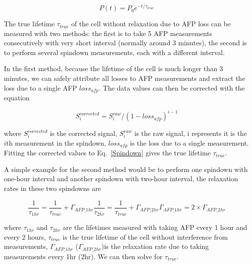 \begin{equation}\label{Spindown}
P(t)=P_{0}e^{-t/\tau_{true}}
\end{equation}

The true lifetime $\tau_{true}$ of the cell without relaxation due to AFP loss can be measured with two methods: the first is to take 5 AFP measurements consecutively with very short interval (normally around 3 minutes), the second is to perform several spindown measurements, each with a different interval. 

In the first method, because the lifetime of the cell is much longer than 3 minutes, we can safely attribute all losses to AFP measurements and extract the loss due to a single AFP $loss_{afp}$. The data values can then be corrected with the equation

\begin{equation}
S_{i}^{corrected}=S_{i}^{raw}/(1-loss_{afp})^{i-1}
\end{equation}

where $S_{i}^{corrected}$ is the corrected signal, $S_{i}^{raw}$ is the raw signal, i represents it is the $i$th measurement in the spindown, $loss_{afp}$ is the loss due to a single measurement. Fitting the corrected values to Eq.~\ref{Spindown} gives the true lifetime $\tau_{true}$.

A simple example for the second method would be to perform one spindown with one-hour interval and another spindown with two-hour interval, the relaxation rates in these two spindowns are

\begin{subequations}
	\begin{equation}
	\frac{1}{\tau_{1hr}}=\frac{1}{\tau_{true}}+\Gamma_{AFP\_1hr}
	\end{equation}
	\begin{equation}
	\frac{1}{\tau_{2hr}}=\frac{1}{\tau_{true}}+\Gamma_{AFP\_2hr}
	\end{equation}
	\begin{equation}
	\Gamma_{AFP\_1hr}=2\times \Gamma_{AFP\_2hr}
	\end{equation}
\end{subequations}

where $\tau_{1hr}$ and $\tau_{2hr}$ are the lifetimes measured with taking AFP every 1 hour and every 2 hours, $\tau_{true}$ is the true lifetime of the cell without interference from measurements, $\Gamma_{AFP\_1hr}$ ($\Gamma_{AFP\_2hr}$)is the relaxation rate due to taking measurements every 1hr (2hr). We can then solve for $\tau_{true}$.

